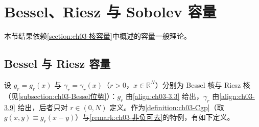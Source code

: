 \documentclass[../../main.tex]{subfiles}%
\begin{document}
\section{Bessel、Riesz 与 Sobolev 容量}\label{section:ch03-特殊容量}

本节结果依赖\cref{section:ch03-核容量}中概述的容量一般理论。

\subsection{Bessel 与 Riesz 容量}\label{subsection:ch03-BesselRiesz}

设 $g_r=g_r(x)$ 与 $\gamma_r=\gamma_r(x)$（$r>0$，$x\in\mathbb{R}^N$）分别为 Bessel 核与 Riesz 核（见\cref{subsection:ch03-Bessel位势}）：$g_r$ 由\eqref{align:ch03-3.3} 给出，$\gamma_r$ 由\eqref{align:ch03-3.9} 给出，后者只对 $r\in(0,N)$ 定义。作为\cref{definition:ch03-Cgp}（取 $g(x,y)\equiv g_r(x-y)$）与\cref{remark:ch03-非负可去}的特例，有如下定义。
\end{document}
